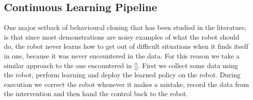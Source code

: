 \documentclass[letterpaper, 10 pt, conference]{ieeeconf}
\begin{document}
\subsection{Continuous Learning Pipeline}
One major setback of behavioural cloning that has been studied in the literature, is that since most demonstrations are noisy examples of what the robot should do, the robot never learns how to get out of difficult situations when it finds itself in one, because it was never encountered in the data. For this reason we take a similar approach to the one encountered in []. First we collect some data using the robot, perform learning and deploy the learned policy on the robot. During execution we correct the robot whenever it makes a mistake, record the data from the intervention and then hand the control back to the robot.


\end{document}

